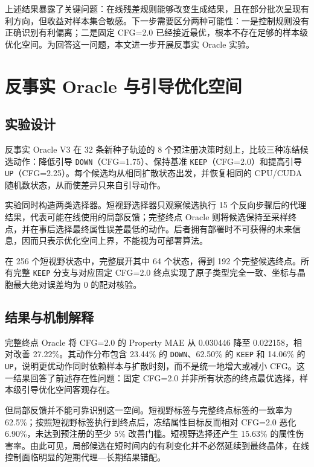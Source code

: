 上述结果暴露了关键问题：在线残差规则能够改变生成结果，且在部分批次呈现有利方向，但收益对样本集合敏感。下一步需要区分两种可能性：一是控制规则没有正确识别有利偏离；二是固定 CFG=2.0 已经接近最优，根本不存在足够的样本级优化空间。为回答这一问题，本文进一步开展反事实 Oracle 实验。

\section{反事实 Oracle 与引导优化空间}

\subsection{实验设计}

反事实 Oracle V3 在 32 条新种子轨迹的 8 个预注册决策时刻上，比较三种冻结候选动作：降低引导 \texttt{DOWN}（CFG=1.75）、保持基准 \texttt{KEEP}（CFG=2.0）和提高引导 \texttt{UP}（CFG=2.25）。每个候选均从相同扩散状态出发，并恢复相同的 CPU/CUDA 随机数状态，从而使差异只来自引导动作。

实验同时构造两类选择器。短视野选择器只观察候选执行 15 个反向步骤后的代理结果，代表可能在线使用的局部反馈；完整终点 Oracle 则将候选保持至采样终点，并在事后选择最终属性误差最低的动作。后者拥有部署时不可获得的未来信息，因而只表示优化空间上界，不能视为可部署算法。

在 256 个短视野状态中，完整展开其中 64 个状态，得到 192 个完整候选终点。所有完整 \texttt{KEEP} 分支与对应固定 CFG=2.0 终点实现了原子类型完全一致、坐标与晶胞最大绝对误差均为 0 的配对核验。

\subsection{结果与机制解释}

完整终点 Oracle 将 CFG=2.0 的 Property MAE 从 0.030446 降至 0.022158，相对改善 27.22\%。其动作分布包含 23.44\% 的 \texttt{DOWN}、62.50\% 的 \texttt{KEEP} 和 14.06\% 的 \texttt{UP}，说明更优动作同时依赖样本与扩散时刻，而不是统一地增大或减小 CFG。这一结果回答了前述存在性问题：固定 CFG=2.0 并非所有状态的终点最优选择，样本级引导优化空间客观存在。

但局部反馈并不能可靠识别这一空间。短视野标签与完整终点标签的一致率为 62.5\%；按照短视野标签执行到终点后，冻结属性目标反而相对 CFG=2.0 恶化 6.90\%，未达到预注册的至少 5\% 改善门槛。短视野选择还产生 15.63\% 的属性伤害率。由此可见，局部候选在短时间内的有利变化并不必然延续到最终晶体，在线控制面临明显的短期代理---长期结果错配。

